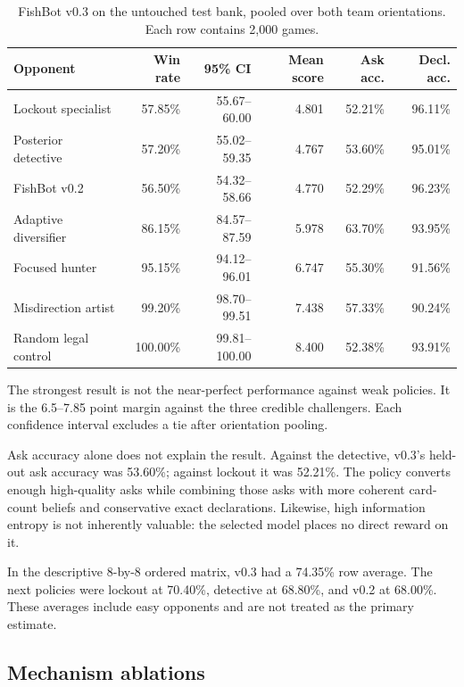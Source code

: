 \documentclass[11pt]{article}
\begin{document}
\begin{table}[ht]
\centering
\caption{FishBot v0.3 on the untouched test bank, pooled over both team orientations. Each row contains 2,000 games.}
\small
\begin{tabular}{lrrrrr}
\toprule
Opponent & Win rate & 95\% CI & Mean score & Ask acc. & Decl. acc. \\
\midrule
Lockout specialist & 57.85\% & 55.67--60.00 & 4.801 & 52.21\% & 96.11\% \\
Posterior detective & 57.20\% & 55.02--59.35 & 4.767 & 53.60\% & 95.01\% \\
FishBot v0.2 & 56.50\% & 54.32--58.66 & 4.770 & 52.29\% & 96.23\% \\
Adaptive diversifier & 86.15\% & 84.57--87.59 & 5.978 & 63.70\% & 93.95\% \\
Focused hunter & 95.15\% & 94.12--96.01 & 6.747 & 55.30\% & 91.56\% \\
Misdirection artist & 99.20\% & 98.70--99.51 & 7.438 & 57.33\% & 90.24\% \\
Random legal control & 100.00\% & 99.81--100.00 & 8.400 & 52.38\% & 93.91\% \\
\bottomrule
\end{tabular}
\end{table}

The strongest result is not the near-perfect performance against weak policies. It is the 6.5--7.85 point margin against the three credible challengers. Each confidence interval excludes a tie after orientation pooling.

Ask accuracy alone does not explain the result. Against the detective, v0.3's held-out ask accuracy was 53.60\%; against lockout it was 52.21\%. The policy converts enough high-quality asks while combining those asks with more coherent card-count beliefs and conservative exact declarations. Likewise, high information entropy is not inherently valuable: the selected model places no direct reward on it.

In the descriptive 8-by-8 ordered matrix, v0.3 had a 74.35\% row average. The next policies were lockout at 70.40\%, detective at 68.80\%, and v0.2 at 68.00\%. These averages include easy opponents and are not treated as the primary estimate.

\subsection{Mechanism ablations}
\end{document}
